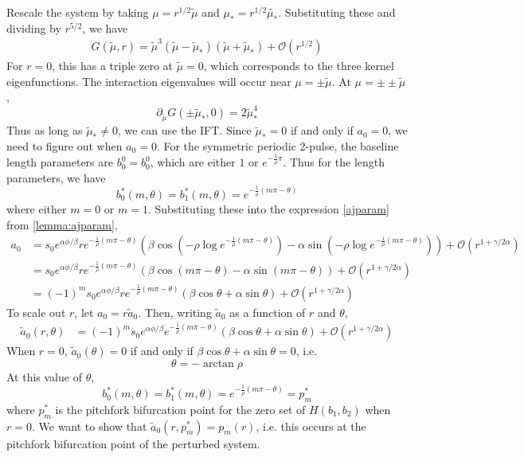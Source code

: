 \documentclass[thesis.tex]{subfiles}
\begin{document}
Rescale the system by taking $\mu = r^{1/2} \tilde{\mu}$ and $\mu_* = r^{1/2} \tilde{\mu_*}$. Substituting these and dividing by $r^{5/2}$, we have
\begin{equation*}
\begin{aligned}
G(\tilde{\mu}, r) = \tilde{\mu}^3 (\tilde{\mu} - \tilde{\mu}_*)(\tilde{\mu} + \tilde{\mu}_*) + \mathcal{O}( r^{1/2} ) 
\end{aligned}
\end{equation*}
For $r = 0$, this has a triple zero at $\tilde{\mu} = 0$, which corresponds to the three kernel eigenfunctions. The interaction eigenvalues will occur near $\mu = \pm \tilde{\mu}$. At $\mu = \pm \pm \tilde{\mu}$, 
\[
\partial_{\tilde{\mu}}G(\pm \tilde{\mu}_*, 0) = 2 \tilde{\mu}_*^4
\]
Thus as long as $\tilde{\mu}_* \neq 0$, we can use the IFT. Since $\tilde{\mu}_* = 0$ if and only if $a_0 = 0$, we need to figure out when $a_0 = 0$. For the symmetric periodic 2-pulse, the baseline length parameters are $b_0^0 = b_0^0$, which are either $1$ or $e^{-\frac{1}{\rho} \pi}$. Thus for the length parameters, we have
\[
b_0^*(m, \theta) = b_1^*(m, \theta) = e^{-\frac{1}{\rho}(m \pi - \theta) }
\]
where either $m = 0$ or $m = 1$. Substituting these into the expression \cref{ajparam} from \cref{lemma:ajparam}, 
\begin{align*}
a_0 &= s_0 e^{\alpha \phi/\beta} r e^{-\frac{1}{\rho}(m \pi - \theta) } \left( \beta \cos\left(-\rho \log e^{-\frac{1}{\rho}(m \pi - \theta) } \right) - \alpha \sin \left(-\rho \log e^{-\frac{1}{\rho}(m \pi - \theta) } \right) \right) + \mathcal{O}(r^{1+\gamma/2\alpha}) \\
&= s_0 e^{\alpha \phi/\beta} r e^{-\frac{1}{\rho}(m \pi - \theta) } \left( \beta \cos\left( m \pi - \theta \right) - \alpha \sin \left( m \pi - \theta \right) \right) + \mathcal{O}(r^{1+\gamma/2\alpha}) \\
&= (-1)^m s_0 e^{\alpha \phi/\beta} r e^{-\frac{1}{\rho}(m \pi - \theta) } \left( \beta \cos \theta + \alpha \sin \theta \right) + \mathcal{O}(r^{1+\gamma/2\alpha}) 
\end{align*}
To scale out $r$, let $a_0 = r \tilde{a}_0$. Then, writing $\tilde{a}_0$ as a function of $r$ and $\theta$,
\begin{align*}
\tilde{a}_0(r, \theta)
&= (-1)^m s_0 e^{\alpha \phi/\beta} e^{-\frac{1}{\rho}(m \pi - \theta) } \left( \beta \cos \theta + \alpha \sin \theta \right) + \mathcal{O}(r^{1+\gamma/2\alpha}) 
\end{align*}
When $r = 0$, $\tilde{a}_0(\theta) = 0$ if and only if $\beta \cos \theta + \alpha \sin \theta = 0$, i.e.
\[
\theta = -\arctan \rho
\]
At this value of $\theta$,
\[
b_0^*(m, \theta) = b_1^*(m, \theta)= e^{-\frac{1}{\rho}(m \pi - \theta)} = p^*_m
\]
where $p^*_m$ is the pitchfork bifurcation point for the zero set of $H(b_1, b_2)$ when $r = 0$. We want to show that $\tilde{a}_0(r, p^*_m) = p_m(r)$, i.e. this occurs at the pitchfork bifurcation point of the perturbed system.
\end{document}
